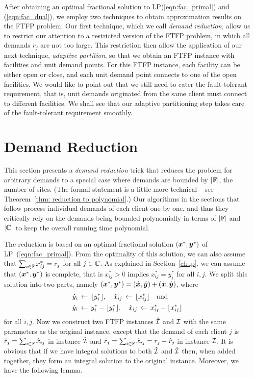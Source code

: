 \documentclass[oneside,final]{ucr}
\begin{document}
After obtaining an optimal fractional solution to
LP(\ref{eqn:fac_primal}) and (\ref{eqn:fac_dual}), we employ
two techniques to obtain approximation results on the FTFP
problem. Our first technique, which we call \emph{demand
  reduction}, allow us to restrict our attention to a
restricted version of the FTFP problem, in which all demands
$r_j$ are not too large. This restriction then allow the
application of our next technique, \emph{adaptive
  partition}, so that we obtain an FTFP instance with
facilities and unit demand points. For this FTFP instance,
each facility can be either open or close, and each unit
demand point connects to one of the open facilities. We
would like to point out that we still need to cater the
fault-tolerant requirement, that is, unit demands originated
from the same client must connect to different
facilities. We shall see that our adaptive partitioning step
takes care of the fault-tolerant requirement smoothly.

\section{Demand Reduction}
\label{sec: polynomial demands}

This section presents a \emph{demand reduction} trick that
reduces the problem for arbitrary demands to a special case
where demands are bounded by $|\mathbb{F}|$, the number of
sites.  (The formal statement is a little more technical --
see Theorem~\ref{thm: reduction to polynomial}.)  Our
algorithms in the sections that follow process individual
demands of each client one by one, and thus they critically
rely on the demands being bounded polynomially in terms of
$|\mathbb{F}|$ and $|\mathbb{C}|$ to keep the overall running time polynomial.

The reduction is based on an optimal fractional solution
$(\boldsymbol{x}^\ast,\boldsymbol{y}^\ast)$ of LP~(\ref{eqn:fac_primal}). From
the optimality of this solution, we can also assume that
$\sum_{i\in\mathbb{F}} x^\ast_{ij} = r_j$ for all
$j\in\mathbb{C}$.  As explained in Section~\ref{ch:lp}, we
can assume that $(\boldsymbol{x}^\ast,\boldsymbol{y}^\ast)$ is complete, that is
$x^\ast_{ij} > 0$ implies $x^\ast_{ij} = y^\ast_i$ for all
$i,j$.  We split this solution into two parts, namely
$(\boldsymbol{x}^\ast,\boldsymbol{y}^\ast) = (\hat{\boldsymbol{x}},\hat{\boldsymbol{y}})+
(\dot{\boldsymbol{x}},\dot{\boldsymbol{y}})$, where
%
\begin{align*}
{\hat y}_i &\;{\,\leftarrow\,}\; { \lfloor y_i^\ast \rfloor }, \quad
			{\hat x}_{ij} \;{\,\leftarrow\,}\; { \lfloor x_{ij}^\ast \rfloor } \quad\textrm{and}
			\\
{\dot y}_i &\;{\,\leftarrow\,}\; y_i^\ast - { \lfloor y_i^\ast \rfloor }, \quad
 	{\dot x}_{ij} \;{\,\leftarrow\,}\; x_{ij}^\ast -  { \lfloor x_{ij}^\ast \rfloor }
\end{align*}
%
for all $i,j$. Now we construct two
FTFP instances $\hatcalI$ and $\dotcalI$ with the same
parameters as the original instance, except that the demand of each client $j$ is
${\hat r}_j = \sum_{i\in\mathbb{F}} {\hat x}_{ij}$ in instance $\hatcalI$ and
${\dot r}_j = \sum_{i\in\mathbb{F}} {\dot x}_{ij} = r_j - {\hat r}_j$ in instance $\dotcalI$. 
It is obvious that if we have integral solutions to both $\hatcalI$
and $\dotcalI$ then, when added together, they form an integral
solution to the original instance.  Moreover, we have the
following lemma.
\end{document}
